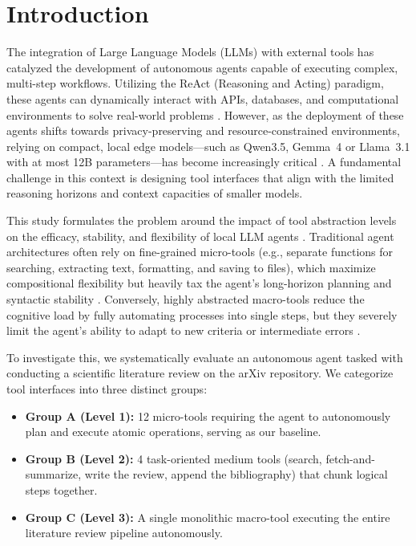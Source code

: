 \section{Introduction}
\label{sec:intro}

The integration of Large Language Models (LLMs) with external tools has catalyzed the development of autonomous agents capable of executing complex, multi-step workflows. Utilizing the ReAct (Reasoning and Acting) paradigm, these agents can dynamically interact with APIs, databases, and computational environments to solve real-world problems \cite{yao2023react}. However, as the deployment of these agents shifts towards privacy-preserving and resource-constrained environments, relying on compact, local edge models---such as Qwen3.5, Gemma~4 or Llama~3.1 with at most 12B parameters---has become increasingly critical \cite{haque2025tinyllm}. A fundamental challenge in this context is designing tool interfaces that align with the limited reasoning horizons and context capacities of smaller models.

This study formulates the problem around the impact of tool abstraction levels on the efficacy, stability, and flexibility of local LLM agents \cite{paschalides2026granite}. Traditional agent architectures often rely on fine-grained micro-tools (e.g., separate functions for searching, extracting text, formatting, and saving to files), which maximize compositional flexibility but heavily tax the agent's long-horizon planning and syntactic stability \cite{schick2023toolformer, qin2024toolllm}. Conversely, highly abstracted macro-tools reduce the cognitive load by fully automating processes into single steps, but they severely limit the agent's ability to adapt to new criteria or intermediate errors \cite{wang2023voyager}. 

To investigate this, we systematically evaluate an autonomous agent tasked with conducting a scientific literature review on the arXiv repository. We categorize tool interfaces into three distinct groups:
\begin{itemize}
    \item \textbf{Group A (Level 1):} 12 micro-tools requiring the agent to autonomously plan and execute atomic operations, serving as our baseline.
    \item \textbf{Group B (Level 2):} 4 task-oriented medium tools (search, fetch-and-summarize, write the review, append the bibliography) that chunk logical steps together.
    \item \textbf{Group C (Level 3):} A single monolithic macro-tool executing the entire literature review pipeline autonomously.
\end{itemize}

